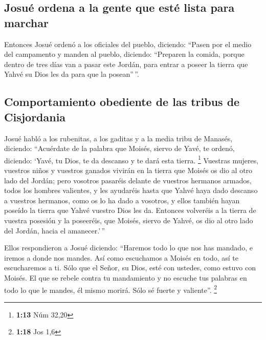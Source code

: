 \begin{paracol}{2}
\hypertarget{josuuxe9-ordena-a-la-gente-que-estuxe9-lista-para-marchar}{%
\subsection{Josué ordena a la gente que esté lista para
marchar}\label{josuuxe9-ordena-a-la-gente-que-estuxe9-lista-para-marchar}}

 Entonces Josué ordenó a los oficiales del pueblo,
diciendo:  ``Pasen por el medio del campamento y manden
al pueblo, diciendo: ``Preparen la comida, porque dentro de tres días
van a pasar este Jordán, para entrar a poseer la tierra que Yahvé su
Dios les da para que la posean''\,''.

\hypertarget{comportamiento-obediente-de-las-tribus-de-cisjordania}{%
\subsection{Comportamiento obediente de las tribus de
Cisjordania}\label{comportamiento-obediente-de-las-tribus-de-cisjordania}}

 Josué habló a los rubenitas, a los gaditas y a la media
tribu de Manasés, diciendo:  ``Acuérdate de la palabra
que Moisés, siervo de Yavé, te ordenó, diciendo: `Yavé, tu Dios, te da
descanso y te dará esta tierra. \footnote{\textbf{1:13} Núm 32,20}
 Vuestras mujeres, vuestros niños y vuestros ganados
vivirán en la tierra que Moisés os dio al otro lado del Jordán; pero
vosotros pasaréis delante de vuestros hermanos armados, todos los
hombres valientes, y les ayudaréis  hasta que Yahvé haya
dado descanso a vuestros hermanos, como os lo ha dado a vosotros, y
ellos también hayan poseído la tierra que Yahvé vuestro Dios les da.
Entonces volveréis a la tierra de vuestra posesión y la poseeréis, que
Moisés, siervo de Yahvé, os dio al otro lado del Jordán, hacia el
amanecer.'\,''

 Ellos respondieron a Josué diciendo: ``Haremos todo lo
que nos has mandado, e iremos a donde nos mandes.  Así
como escuchamos a Moisés en todo, así te escucharemos a ti. Sólo que el
Señor, su Dios, esté con ustedes, como estuvo con Moisés.
 El que se rebele contra tu mandamiento y no escuche tus
palabras en todo lo que le mandes, él mismo morirá. Sólo sé fuerte y
valiente''. \footnote{\textbf{1:18} Jos 1,6}

\switchcolumn
\begin{otherlanguage}{english}


\end{otherlanguage}
\end{paracol}
